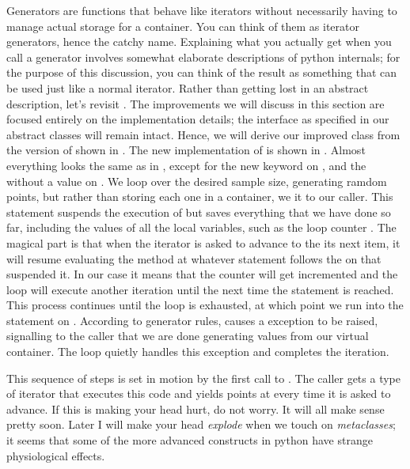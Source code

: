Generators are functions that behave like iterators without necessarily having to manage actual
storage for a container. You can think of them as iterator generators, hence the catchy name.
Explaining what you actually get when you call a generator involves somewhat elaborate
descriptions of python internals; for the purpose of this discussion, you can think of the
result as something that can be used just like a normal iterator. Rather than getting lost in
an abstract description, let's revisit . The improvements we will
discuss in this section are focused entirely on the implementation details; the interface as
specified in our abstract classes will remain intact. Hence, we will derive our improved class
from the version of  shown in . The new
implementation of  is shown in .
%
%
Almost everything looks the same as in , except for the new
keyword  on , and the  without a
value on . We loop over the desired sample size, generating
ramdom points, but rather than storing each one in a container, we  it to our
caller. This statement suspends the execution of  but saves everything that we
have done so far, including the values of all the local variables, such as the loop counter
. The magical part is that when the iterator is asked to advance to the its next
item, it will resume evaluating the method  at whatever statement follows the
 on  that suspended it. In our case it means
that the counter will get incremented and the loop will execute another iteration until the
next time the  statement is reached. This process continues until the loop is
exhausted, at which point we run into the  statement on
. According to generator rules,  causes a
 exception to be raised, signalling to the caller that we are done
generating values from our virtual container. The  loop quietly handles this
exception and completes the iteration.

This sequence of steps is set in motion by the first call to . The caller gets a
type of iterator that executes this code and yields points at 
every time it is asked to advance.  If this is making your head hurt, do not worry. It will all
make sense pretty soon. Later I will make your head {\em explode} when we touch on {\em
  metaclasses}; it seems that some of the more advanced constructs in python have strange
physiological effects\supercite{guido-metaclasses}.

